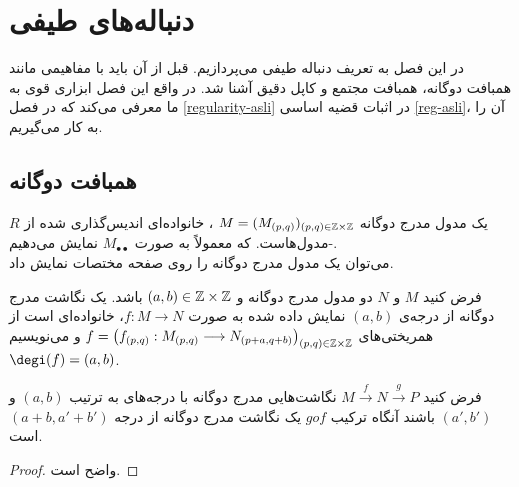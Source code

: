 \chapter{دنباله‌های طیفی}\label{spectral3}
\thispagestyle{empty}
\newpage
در این فصل به تعریف دنباله طیفی
می‌پردازیم. قبل از آن باید با مفاهیمی مانند همبافت دوگانه، همبافت مجتمع و کاپل دقیق آشنا شد. در واقع این فصل ابزاری قوی به ما معرفی می‌کند که در فصل \ref{regularity-asli} در اثبات قضیه اساسی \ref{reg-asli}، آن را به کار می‌گیریم.
\section{{همبافت دوگانه}}
\begin{definition}
یک مدول مدرج دوگانه $M=(M_{(p,q)})_{(p,q)\in\Bbb Z\times \Bbb Z}$ ، خانواده‌ای اندیس‌گذاری شده از $R$-مدول‌هاست. که معمولاً به صورت $M_{\bullet\bullet}$ نمایش می‌دهیم.\\
می‌توان یک مدول مدرج دوگانه را روی صفحه مختصات نمایش داد.
\end{definition}
\begin{definition}
فرض کنید $M$ و $N$ دو مدول مدرج دوگانه و $(a,b)\in\Bbb Z\times \Bbb Z$ باشد. یک نگاشت مدرج دوگانه از درجه‌ی $(a,b)$ نمایش داده شده به صورت $f:M\longrightarrow N$، خانواده‌ای است از همریختی‌های
$f=\left(f_{(p,q)}:M_{(p,q)}\longrightarrow N_{(p+a,q+b)}\right)_{(p,q)\in\Bbb Z\times \Bbb Z}$ و می‌نویسیم $\degi(f)=(a,b)$.
\end{definition}
\begin{theo}
فرض کنید
$M\xrightarrow{f}N\xrightarrow{g} P$
نگاشت‌هایی مدرج دوگانه با درجه‌های به ترتیب $(a,b)$ و $(a',b')$ باشند آنگاه ترکیب $gof$ یک نگاشت مدرج دوگانه از درجه $(a+b,a'+b')$ است.
\end{theo}
\begin{proof}
واضح است.
\end{proof}
